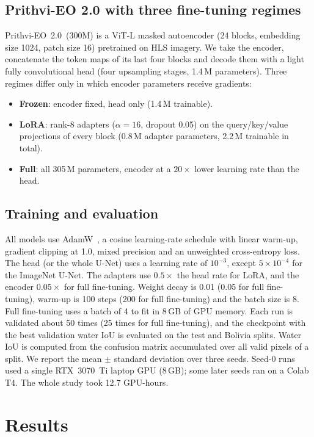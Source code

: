 \documentclass[conference]{IEEEtran}
\begin{document}
\subsection{Prithvi-EO 2.0 with three fine-tuning regimes}
Prithvi-EO~2.0~(300M) is a ViT-L masked autoencoder (24 blocks, embedding size 1024, patch size 16) pretrained on HLS imagery. We take the encoder, concatenate the token maps of its last four blocks and decode them with a light fully convolutional head (four upsampling stages, 1.4\,M parameters). Three regimes differ only in which encoder parameters receive gradients:
\begin{itemize}
  \item \textbf{Frozen}: encoder fixed, head only (1.4\,M trainable).
  \item \textbf{LoRA}: rank-8 adapters ($\alpha=16$, dropout 0.05) on the query/key/value projections of every block (0.8\,M adapter parameters, 2.2\,M trainable in total).
  \item \textbf{Full}: all 305\,M parameters, encoder at a $20\times$ lower learning rate than the head.
\end{itemize}

\subsection{Training and evaluation}
All models use AdamW~\cite{loshchilov2019adamw}, a cosine learning-rate schedule with linear warm-up, gradient clipping at 1.0, mixed precision and an unweighted cross-entropy loss. The head (or the whole U-Net) uses a learning rate of $10^{-3}$, except $5\times10^{-4}$ for the ImageNet U-Net. The adapters use $0.5\times$ the head rate for LoRA, and the encoder $0.05\times$ for full fine-tuning. Weight decay is 0.01 (0.05 for full fine-tuning), warm-up is 100 steps (200 for full fine-tuning) and the batch size is 8. Full fine-tuning uses a batch of 4 to fit in 8\,GB of GPU memory. Each run is validated about 50 times (25 times for full fine-tuning), and the checkpoint with the best validation water IoU is evaluated on the test and Bolivia splits. Water IoU is computed from the confusion matrix accumulated over all valid pixels of a split. We report the mean $\pm$ standard deviation over three seeds. Seed-0 runs used a single RTX~3070~Ti laptop GPU (8\,GB); some later seeds ran on a Colab T4. The whole study took 12.7 GPU-hours.

\section{Results}
\end{document}
